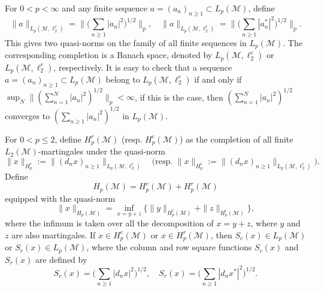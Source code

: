 \documentclass[11]{amsart}
\numberwithin{equation}{section}
\newcommand{\M}{\mathcal{M}}
\begin{document}
For $0< p<\infty$ and any finite sequence $a=(a_n)_{n\geq1}\subset L_p(\mathcal{M})$, define 
$$\|a\|_{L_p(\mathcal{M},\ell_2^c)}=\Big\|\Big(\sum_{n\geq1}|a_n|^2\Big)^{1/2}\Big\|_{p},\quad \|a\|_{L_p(\mathcal{M},\ell_2^r)}=\Big\|\Big(\sum_{n\geq1}|a_n^*|^2\Big)^{1/2}\Big\|_{p}.$$
This gives two quasi-norms on the family of all finite sequences in $ L_p(\mathcal{M})$. The corresponding completion is a Banach space, denoted by $L_p(\mathcal{M},\ell_2^c)$ or $L_p(\mathcal{M},\ell_2^r)$, respectively. It is easy to check that
a sequence $a=(a_n)_{n\geq1}\subset L_p(\mathcal{M})$ belong to $L_p(\mathcal{M},\ell_2^c)$ if and only if $\sup_N\|(\sum_{n=1}^N|a_n|^2)^{1/2}\|_{p}<\infty$, if this is the case, then $(\sum_{n=1}^N|a_n|^2)^{1/2}$ converges to $(\sum_{n\geq1}|a_n|^2)^{1/2}$ in $L_p(\mathcal{M})$.






For $0<p\leq 2$, define $H_p^r(\mathcal{M})$ (resp. $H_p^c(\mathcal{M})$) as the completion of all finite $L_2(\M)$-martingales under the quasi-norm 
$$\|x\|_{H_p^r}:=\|(d_nx)_{n\geq1}\|_{L_p(\mathcal{M},\ell_2^r)}\quad \mbox{(resp. $\|x\|_{H_p^c}:=\|(d_nx)_{n\geq1}\|_{L_p(\mathcal{M},\ell_2^c)}$)}.$$
Define 
$$H_p(\mathcal{M})=H_p^c(\mathcal{M})+H_p^r(\mathcal{M})$$
equipped with the quasi-norm
$$\|x\|_{H_p(\mathcal{M})}=\inf_{x=y+z}\{\|y\|_{H_p^c(\mathcal{M})}+\|z\|_{H_p^r(\mathcal{M})}\},$$
where the infimum is taken over all the decomposition of $x=y+z$, where $y$ and $z$ are also martingales. 
If $x\in H_p^c(\mathcal{M})$ or $x\in H_p^r(\mathcal{M})$, then $S_c(x)\in L_p(\mathcal{M})$ or $S_r(x)\in L_p(\mathcal{M})$, where  the column and  row   square functions $S_c(x)$ and $S_r(x)$ are defined by
\begin{equation}\label{def:S}
	S_c(x)=\Big(\sum_{n\geq1}|d_nx|^2\Big)^{1/2}, \quad S_r(x)=\Big(\sum_{n\geq1}|d_nx^*|^2\Big)^{1/2}.
\end{equation}
\end{document}
